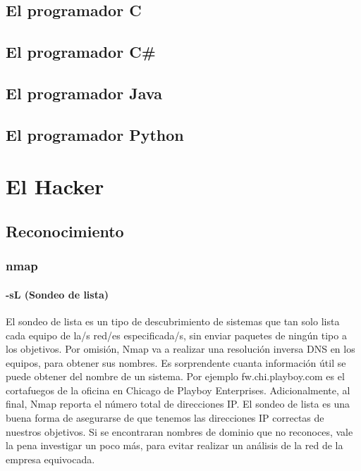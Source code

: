 \documentclass[a4paper, 11pt, titlepage]{book}
\begin{document}
    \section{El programador C}

    \section{El programador C\#}

    \section{El programador Java}

    \section{El programador Python}

\chapter{El Hacker}

    \section{Reconocimiento}
            
        \subsection{nmap}


            \subsubsection{\textbf{-sL (Sondeo de lista)}} El sondeo de lista es un tipo de descubrimiento
            de sistemas que tan solo lista cada equipo de la/s red/es especificada/s, sin enviar paquetes 
            de ningún tipo a los objetivos. Por omisión, Nmap va a realizar una resolución inversa DNS en 
            los equipos, para obtener sus nombres. Es sorprendente cuanta información útil se puede obtener 
            del nombre de un sistema. Por ejemplo fw.chi.playboy.com es el cortafuegos de la oficina en 
            Chicago de Playboy Enterprises. Adicionalmente, al final, Nmap reporta el número total de 
            direcciones IP. El sondeo de lista es una buena forma de asegurarse de que tenemos las 
            direcciones IP correctas de nuestros objetivos. Si se encontraran nombres de dominio que no 
            reconoces, vale la pena investigar un poco más, para evitar realizar un análisis de la red 
            de la empresa equivocada.
\end{document}
